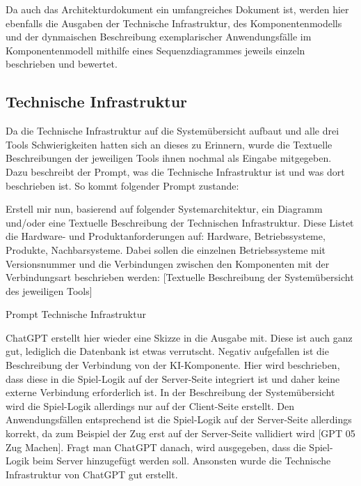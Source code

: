 Da auch das Architekturdokument ein umfangreiches Dokument ist, werden hier ebenfalls die Ausgaben der Technische Infrastruktur, des Komponentenmodells 
und der dynmaischen Beschreibung exemplarischer Anwendungsfälle im Komponentenmodell mithilfe eines Sequenzdiagrammes jeweils einzeln beschrieben und bewertet.

\subsection*{Technische Infrastruktur}

Da die Technische Infrastruktur auf die Systemübersicht aufbaut und alle drei Tools Schwierigkeiten hatten sich an dieses zu Erinnern, wurde die Textuelle 
Beschreibungen der jeweiligen Tools ihnen nochmal als Eingabe mitgegeben. Dazu beschreibt der Prompt, was die Technische Infrastruktur ist und was dort 
beschrieben ist. So kommt folgender Prompt zustande:

\begin{prompt}[H]
    \begin{tcolorbox}[colback=gray!20, colframe=gray!20, boxrule=0pt, sharp corners] 
        Erstell mir nun, basierend auf folgender Systemarchitektur, ein Diagramm und/oder eine Textuelle Beschreibung der Technischen Infrastruktur. 
        Diese Listet die Hardware- und Produktanforderungen auf: Hardware, Betriebssysteme, Produkte, Nachbarsysteme. Dabei sollen die einzelnen 
        Betriebssysteme mit Versionsnummer und die Verbindungen zwischen den Komponenten mit der Verbindungsart beschrieben werden: [Textuelle 
        Beschreibung der Systemübersicht des jeweiligen Tools]
        \vfill
    \end{tcolorbox}
    \caption{Prompt Technische Infrastruktur}
    \label{Prompt Technische Infrastruktur}
\end{prompt}

ChatGPT erstellt hier wieder eine Skizze in die Ausgabe mit. Diese ist auch ganz gut, lediglich die Datenbank ist etwas verrutscht. Negativ aufgefallen
ist die Beschreibung der Verbindung von der KI-Komponente. Hier wird beschrieben, dass diese in die Spiel-Logik auf der Server-Seite integriert ist und 
daher keine externe Verbindung erforderlich ist. In der Beschreibung der Systemübersicht wird die Spiel-Logik allerdings nur auf der Client-Seite erstellt.
Den Anwendungsfällen entsprechend ist die Spiel-Logik auf der Server-Seite allerdings korrekt, da zum Beispiel der Zug erst auf der Server-Seite 
vallidiert wird [GPT 05 Zug Machen]. Fragt man ChatGPT danach, wird ausgegeben, dass die Spiel-Logik 
beim Server hinzugefügt werden soll. Ansonsten wurde die Technische Infrastruktur von ChatGPT gut erstellt.\\

